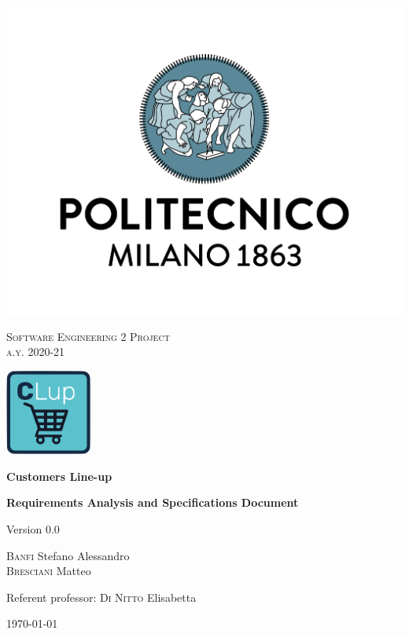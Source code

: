 \documentclass[fontsize=11pt,paper=a4,pagesize=auto]{report}
\begin{document}
\begin{titlepage}
	\centering
	\includegraphics[scale = 0.20]{images/polimi.jpg}\par
	{\scshape\Large
		Software Engineering 2 Project\\
		a.y. 2020-21\par}
			\vspace{0.5cm}
		\includegraphics[width=80pt]{images/CLup_logo.png}\par
	{\huge\bfseries
		Customers Line-up\\\par}

	{\Large\bfseries
		Requirements Analysis and Specifications Document\par}
	Version 0.0\par
	\vspace{1cm}
	{\Large
		{\scshape Banfi}  Stefano Alessandro\\
		{\scshape Bresciani} Matteo\par}
	\vfill
	Referent professor: {\scshape Di Nitto} Elisabetta\par
	\vfill
	{\large\today\par}
\end{titlepage}
\end{document}
